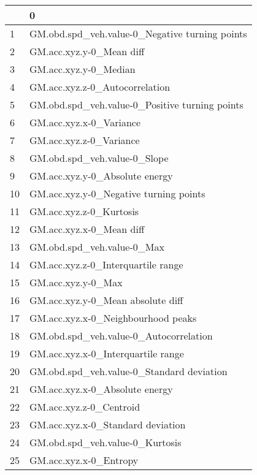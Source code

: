 \begin{tabular}{ll}
\toprule
{} &                                                 0 \\
\midrule
1   &    GM.obd.spd\_veh.value-0\_Negative turning points \\
2   &                          GM.acc.xyz.y-0\_Mean diff \\
3   &                             GM.acc.xyz.y-0\_Median \\
4   &                    GM.acc.xyz.z-0\_Autocorrelation \\
5   &    GM.obd.spd\_veh.value-0\_Positive turning points \\
6   &                           GM.acc.xyz.x-0\_Variance \\
7   &                           GM.acc.xyz.z-0\_Variance \\
8   &                      GM.obd.spd\_veh.value-0\_Slope \\
9   &                    GM.acc.xyz.y-0\_Absolute energy \\
10  &            GM.acc.xyz.y-0\_Negative turning points \\
11  &                           GM.acc.xyz.z-0\_Kurtosis \\
12  &                          GM.acc.xyz.x-0\_Mean diff \\
13  &                        GM.obd.spd\_veh.value-0\_Max \\
14  &                GM.acc.xyz.z-0\_Interquartile range \\
15  &                                GM.acc.xyz.y-0\_Max \\
16  &                 GM.acc.xyz.y-0\_Mean absolute diff \\
17  &                GM.acc.xyz.x-0\_Neighbourhood peaks \\
18  &            GM.obd.spd\_veh.value-0\_Autocorrelation \\
19  &                GM.acc.xyz.x-0\_Interquartile range \\
20  &         GM.obd.spd\_veh.value-0\_Standard deviation \\
21  &                    GM.acc.xyz.x-0\_Absolute energy \\
22  &                           GM.acc.xyz.z-0\_Centroid \\
23  &                 GM.acc.xyz.x-0\_Standard deviation \\
24  &                   GM.obd.spd\_veh.value-0\_Kurtosis \\
25  &                            GM.acc.xyz.x-0\_Entropy \\

\end{tabular}
